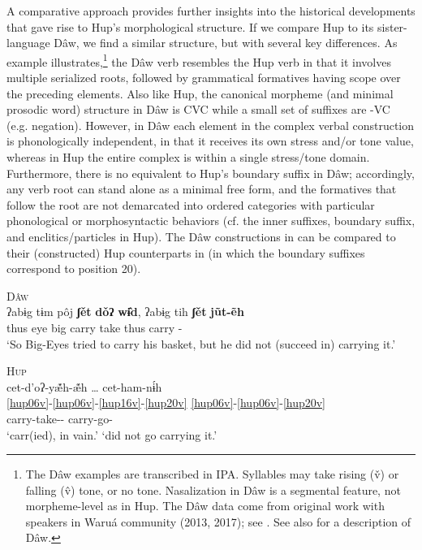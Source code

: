 \documentclass[output=paper]{langscibook}
\begin{document}
A comparative approach provides further insights into the historical developments that gave rise to Hup's morphological structure. If we compare Hup to its sister-language Dâw, we find a similar structure, but with several key differences. As example  illustrates,\footnote{The Dâw examples are transcribed in IPA. Syllables may take rising (\v{v}) or falling (\^{v}) tone, or no tone. Nasalization in Dâw is a segmental feature, not morpheme-level as in Hup. The Dâw data come from original work with speakers in Waruá community (2013, 2017); see \citet{eppsobertstorto2013daw}. See also \citet{Martins2004} for a description of Dâw.} the Dâw verb resembles the Hup verb in that it involves multiple serialized roots, followed by grammatical formatives having scope over the preceding elements. Also like Hup, the canonical morpheme (and minimal prosodic word) structure in Dâw is CVC while a small set of suffixes are -VC (e.g. negation). However, in Dâw each element in the complex verbal construction is phonologically independent, in that it receives its own stress and/or tone value, whereas in Hup the entire complex is within a single stress/tone domain. Furthermore, there is no equivalent to Hup's boundary suffix in Dâw; accordingly, any verb root can stand alone as a minimal free form, and the formatives that follow the root are not demarcated into ordered categories with particular phonological or morphosyntactic behaviors (cf. the inner suffixes, boundary suffix, and enclitics/particles in Hup). The Dâw constructions in  can be compared to their (constructed) Hup counterparts in  (in which the boundary suffixes correspond to position 20).

\ea\label{ex:hup:key:36} \textsc{Dâw} \\
    \gll ʔabɨg tɨm pôj \textbf{ʃět} \textbf{dǒʔ} \textbf{wɨ̂d}, ʔabɨg tih \textbf{ʃět} \textbf{jũt-ẽh}\\ 
 thus eye big carry take \Frust{} thus \Third\Sg{} carry \Pfv-\Neg{}\\ 
\glt `So Big-Eyes tried to carry his basket, but he did not (succeed in) carrying it.'   
\z 

\ea\label{ex:hup:key:37} \textsc{Hup} \\
\glll cet-d'oʔ-yæ̃́h-æ̃́h \dots	{} cet-ham-nɨ́h\\ 
\ref{hup06v}-\ref{hup06v}-\ref{hup16v}-\ref{hup20v} {} \ref{hup06v}-\ref{hup06v}-\ref{hup20v}\\ 
carry-take-\Frust-\Decl{} {} carry-go-\Neg{}\\ 
\glt `carr(ied), in vain.' {}   `did not go carrying it.'  
\z 
\end{document}
